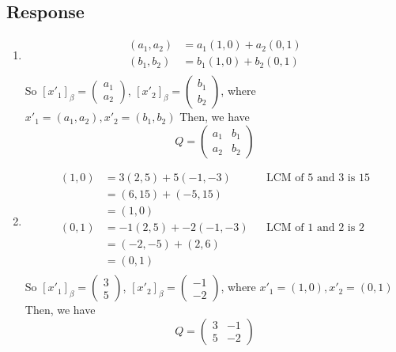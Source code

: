 \documentclass[13pt]{article}
\begin{document}
        \subsection*{Response}
        \begin{enumerate}[label=(\alph*),leftmargin=*]
        \item
          \begin{align*}
            (a_1, a_2) &= a_1(1, 0) + a_2(0, 1) \\
            (b_1, b_2) &= b_1(1, 0) + b_2(0, 1) \\
          \end{align*}
          So $[x'_1]_\beta =
          \begin{pmatrix}
            a_1 \\ a_2
          \end{pmatrix}$, $[x'_2]_\beta =
          \begin{pmatrix}
            b_1 \\ b_2
          \end{pmatrix}$, where $x'_1 = (a_1, a_2), x'_2 = (b_1, b_2)$
          Then, we have
          \[Q =
            \begin{pmatrix}
              a_1 & b_1 \\
              a_2 & b_2
            \end{pmatrix}
          \]
        \item
          \begin{align*}
            (1, 0) &= 3(2, 5) + 5(-1, -3) && \text{LCM of } 5 \text{ and } 3 \text{ is } 15 \\
                   &= (6, 15) + (-5, 15) \\
                   &= (1, 0) \\
            (0, 1) &= -1(2, 5) + -2(-1, -3) && \text{LCM of } 1 \text{ and } 2 \text{ is } 2 \\
                   &= (-2, -5) + (2, 6) \\
                   &= (0, 1) \\
          \end{align*}
          So $[x'_1]_\beta =
          \begin{pmatrix}
            3 \\ 5
          \end{pmatrix}$, $[x'_2]_\beta =
          \begin{pmatrix}
            -1 \\ -2
          \end{pmatrix}$, where $x'_1 = (1, 0), x'_2 = (0, 1)$
          Then, we have
          \[Q =
            \begin{pmatrix}
              3 & -1 \\
              5 & -2
            \end{pmatrix}
          \] 
        \end{enumerate}
\end{document}
